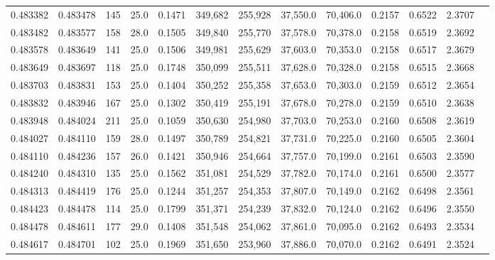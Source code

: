 \begin{tabular}{rrrrrrrrrrrrr}
0.483382 & 0.483478 &   145 & 25.0 &                                     0.1471 & 349,682 & 255,928 &  37,550.0 &  70,406.0 & 0.2157 & 0.6522 & 2.3707 \\
0.483482 & 0.483577 &   158 & 28.0 &                                     0.1505 & 349,840 & 255,770 &  37,578.0 &  70,378.0 & 0.2158 & 0.6519 & 2.3692 \\
0.483578 & 0.483649 &   141 & 25.0 &                                     0.1506 & 349,981 & 255,629 &  37,603.0 &  70,353.0 & 0.2158 & 0.6517 & 2.3679 \\
0.483649 & 0.483697 &   118 & 25.0 &                                     0.1748 & 350,099 & 255,511 &  37,628.0 &  70,328.0 & 0.2158 & 0.6515 & 2.3668 \\
0.483703 & 0.483831 &   153 & 25.0 &                                     0.1404 & 350,252 & 255,358 &  37,653.0 &  70,303.0 & 0.2159 & 0.6512 & 2.3654 \\
0.483832 & 0.483946 &   167 & 25.0 &                                     0.1302 & 350,419 & 255,191 &  37,678.0 &  70,278.0 & 0.2159 & 0.6510 & 2.3638 \\
0.483948 & 0.484024 &   211 & 25.0 &                                     0.1059 & 350,630 & 254,980 &  37,703.0 &  70,253.0 & 0.2160 & 0.6508 & 2.3619 \\
0.484027 & 0.484110 &   159 & 28.0 &                                     0.1497 & 350,789 & 254,821 &  37,731.0 &  70,225.0 & 0.2160 & 0.6505 & 2.3604 \\
0.484110 & 0.484236 &   157 & 26.0 &                                     0.1421 & 350,946 & 254,664 &  37,757.0 &  70,199.0 & 0.2161 & 0.6503 & 2.3590 \\
0.484240 & 0.484310 &   135 & 25.0 &                                     0.1562 & 351,081 & 254,529 &  37,782.0 &  70,174.0 & 0.2161 & 0.6500 & 2.3577 \\
0.484313 & 0.484419 &   176 & 25.0 &                                     0.1244 & 351,257 & 254,353 &  37,807.0 &  70,149.0 & 0.2162 & 0.6498 & 2.3561 \\
0.484423 & 0.484478 &   114 & 25.0 &                                     0.1799 & 351,371 & 254,239 &  37,832.0 &  70,124.0 & 0.2162 & 0.6496 & 2.3550 \\
0.484478 & 0.484611 &   177 & 29.0 &                                     0.1408 & 351,548 & 254,062 &  37,861.0 &  70,095.0 & 0.2162 & 0.6493 & 2.3534 \\
0.484617 & 0.484701 &   102 & 25.0 &                                     0.1969 & 351,650 & 253,960 &  37,886.0 &  70,070.0 & 0.2162 & 0.6491 & 2.3524 \\

\end{tabular}
